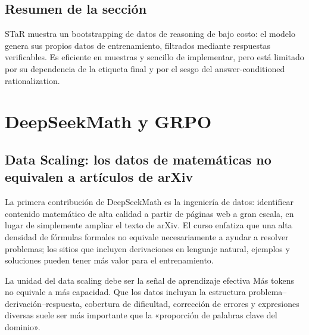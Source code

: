 \documentclass[a4paper]{article}
\begin{document}
\subsection{Resumen de la sección}

STaR muestra un bootstrapping de datos de reasoning de bajo costo: el modelo genera sus propios datos de entrenamiento, filtrados mediante respuestas verificables. Es eficiente en muestras y sencillo de implementar, pero está limitado por su dependencia de la etiqueta final y por el sesgo del answer-conditioned rationalization.
\section{DeepSeekMath y GRPO}

\subsection{Data Scaling: los datos de matemáticas no equivalen a artículos de arXiv}

La primera contribución de DeepSeekMath es la ingeniería de datos: identificar contenido matemático de alta calidad a partir de páginas web a gran escala, en lugar de simplemente ampliar el texto de arXiv. El curso enfatiza que una alta densidad de fórmulas formales no equivale necesariamente a ayudar a resolver problemas; los sitios que incluyen derivaciones en lenguaje natural, ejemplos y soluciones pueden tener más valor para el entrenamiento.




\begin{importantbox}{La unidad del data scaling debe ser la señal de aprendizaje efectiva}
Más tokens no equivale a más capacidad. Que los datos incluyan la estructura problema--derivación--respuesta, cobertura de dificultad, corrección de errores y expresiones diversas suele ser más importante que la «proporción de palabras clave del dominio».
\end{importantbox}
\end{document}
